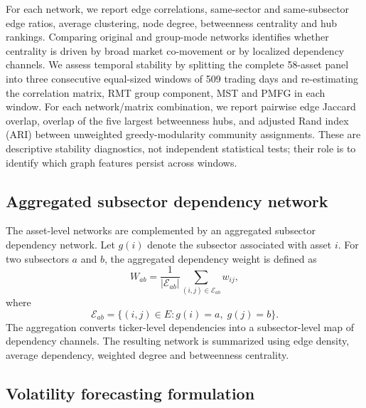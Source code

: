 For each network, we report edge correlations, same-sector and same-subsector edge ratios, average clustering, node degree, betweenness centrality and hub rankings. Comparing original and group-mode networks identifies whether centrality is driven by broad market co-movement or by localized dependency channels. We assess temporal stability by splitting the complete 58-asset panel into three consecutive equal-sized windows of 509 trading days and re-estimating the correlation matrix, RMT group component, MST and PMFG in each window. For each network/matrix combination, we report pairwise edge Jaccard overlap, overlap of the five largest betweenness hubs, and adjusted Rand index (ARI) between unweighted greedy-modularity community assignments. These are descriptive stability diagnostics, not independent statistical tests; their role is to identify which graph features persist across windows.

\subsection{Aggregated subsector dependency network}
\label{subsec:subsector_network_method}

The asset-level networks are complemented by an aggregated subsector dependency network. Let $g(i)$ denote the subsector associated with asset $i$. For two subsectors $a$ and $b$, the aggregated dependency weight is defined as
\begin{equation}
W_{ab}
=
\frac{1}{|\mathcal{E}_{ab}|}
\sum_{(i,j)\in \mathcal{E}_{ab}}
w_{ij},
\end{equation}
where
\begin{equation}
\mathcal{E}_{ab}
=
\{(i,j)\in E : g(i)=a,\; g(j)=b\}.
\end{equation}
The aggregation converts ticker-level dependencies into a subsector-level map of dependency channels. The resulting network is summarized using edge density, average dependency, weighted degree and betweenness centrality.

\subsection{Volatility forecasting formulation}
\label{subsec:forecasting_method}


